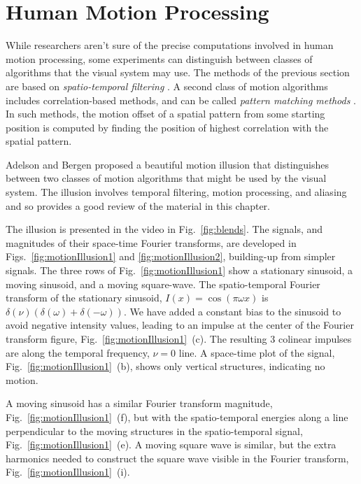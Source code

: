 \section{Human Motion Processing}

While researchers aren't sure of the precise computations involved in human motion processing, some experiments  can distinguish between classes of algorithms that the visual system may use.  The methods of the previous section are based on {\em spatio-temporal filtering} \cite{Adelson85}.  A second class of motion algorithms includes correlation-based methods, and can be called {\em pattern matching methods} \cite{Adelson85}.  In such methods, the motion offset of a spatial pattern from some starting position is computed by finding the position of highest correlation with the spatial pattern.

Adelson and Bergen proposed a beautiful motion illusion that distinguishes between two classes of motion algorithms that might be used by the visual system.  The illusion involves temporal filtering, motion processing, and aliasing and so provides a good review of the material in this chapter.

The illusion is presented in the video in Fig.~\ref{fig:blends}. The signals, and magnitudes of their space-time Fourier transforms, are developed in Figs.~\ref{fig:motionIllusion1} and \ref{fig:motionIllusion2}, building-up from simpler signals.  The three rows of Fig.~\ref{fig:motionIllusion1} show a stationary sinusoid, a moving sinusoid, and a moving square-wave.  The spatio-temporal Fourier transform of the stationary sinusoid, $I(x) = \cos(\pi \omega x)$ is $\delta(\nu) (\delta(\omega) + \delta(-\omega))$.  We have added a constant bias to the sinusoid to avoid negative intensity values, leading to an impulse at the center of the Fourier transform figure, Fig.~\ref{fig:motionIllusion1}~(c).  The resulting 3 colinear impulses are along the temporal frequency, $\nu = 0$ line.  A space-time plot of the signal, Fig.~\ref{fig:motionIllusion1}~(b), shows only vertical structures, indicating no motion.

A moving sinusoid has a similar Fourier transform magnitude, Fig.~\ref{fig:motionIllusion1}~(f), but with the spatio-temporal energies along a line perpendicular to the moving structures in the spatio-temporal signal, Fig.~\ref{fig:motionIllusion1}~(e).  A moving square wave is similar, but the extra harmonics needed to construct the square wave visible in the Fourier transform, Fig.~\ref{fig:motionIllusion1}~(i).


